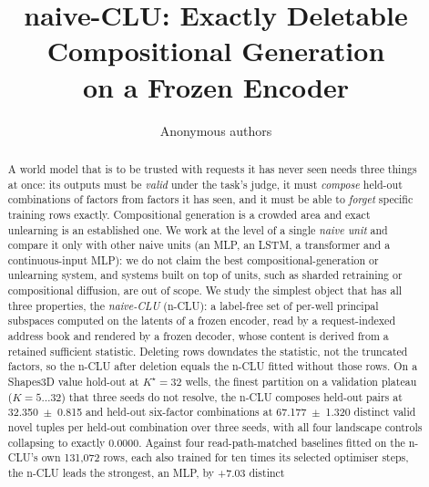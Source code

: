 \documentclass{article} %
\title{naive-CLU: Exactly Deletable Compositional Generation\\ on a Frozen Encoder}
\author{Anonymous authors}
\newcommand{\Kstar}{\ensuremath{K^{\star}}}
\begin{document}
\maketitle

\begin{abstract}
A world model that is to be trusted with requests it has never seen needs three things at
once: its outputs must be \emph{valid} under the task's judge, it must \emph{compose}
held-out combinations of factors from factors it has seen, and it must be able to
\emph{forget} specific training rows exactly. Compositional generation is a crowded area
and exact unlearning is an established one. We work at the level of a single \emph{naive unit} and
compare it only with other naive units (an MLP, an LSTM, a transformer and a continuous-input MLP):
we do not claim the best compositional-generation or unlearning system, and systems built on top of
units, such as sharded retraining or compositional diffusion, are out of scope.
We study the simplest object that has all three properties, the \emph{naive-CLU} (n-CLU): a
label-free set of per-well principal subspaces computed on the latents of a frozen
encoder, read by a request-indexed address book and rendered by a frozen decoder, whose
content is derived from a retained sufficient statistic. Deleting rows downdates the
statistic, not the truncated factors, so the n-CLU after deletion equals the n-CLU fitted
without those rows. On a Shapes3D value hold-out at $\Kstar=32$ wells, the finest partition on a validation plateau
($K=5\ldots32$) that three seeds do not resolve, %
the n-CLU composes held-out pairs at 32.350~$\pm$~0.815 and held-out six-factor combinations at
67.177~$\pm$~1.320 distinct valid novel tuples per held-out combination over three seeds, with all four landscape
controls collapsing to exactly 0.0000. %
Against four read-path-matched baselines fitted on the n-CLU's own 131,072 rows, each also trained for
ten times its selected optimiser steps, the n-CLU leads the strongest, an MLP, by +7.03 distinct

\end{abstract}
\end{document}

